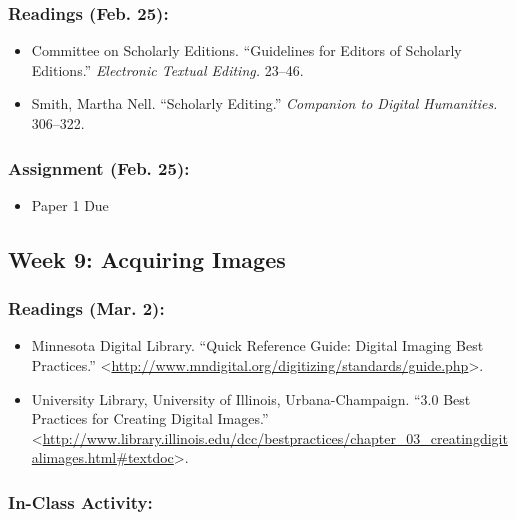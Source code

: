 \documentclass[]{article}
\begin{document}
\subsubsection{Readings (Feb. 25):}\label{readings-feb.-25}

\begin{itemize}
\itemsep1pt\parskip0pt
\item
  Committee on Scholarly Editions. ``Guidelines for Editors of Scholarly
  Editions.'' \emph{Electronic Textual Editing.} 23--46.
\item
  Smith, Martha Nell. ``Scholarly Editing.'' \emph{Companion to Digital
  Humanities.} 306--322.
\end{itemize}

\subsubsection{Assignment (Feb. 25):}\label{assignment-feb.-25}

\begin{itemize}
\itemsep1pt\parskip0pt
\item
  Paper 1 Due
\end{itemize}

\subsection{Week 9: Acquiring Images}\label{week-9-acquiring-images}

\subsubsection{Readings (Mar. 2):}\label{readings-mar.-2}

\begin{itemize}
\itemsep1pt\parskip0pt
\item
  Minnesota Digital Library. ``Quick Reference Guide: Digital Imaging
  Best Practices.''
  \textless{}\url{http://www.mndigital.org/digitizing/standards/guide.php}\textgreater{}.
\item
  University Library, University of Illinois, Urbana-Champaign. ``3.0
  Best Practices for Creating Digital Images.''
  \textless{}\url{http://www.library.illinois.edu/dcc/bestpractices/chapter_03_creatingdigitalimages.html\#textdoc}\textgreater{}.
\end{itemize}

\subsubsection{In-Class Activity:}\label{in-class-activity}
\end{document}
